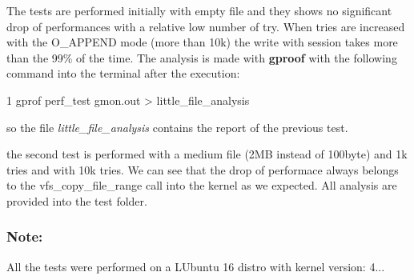 The tests are performed initially with empty file and they shows no significant drop of performances with a relative low number of try. When tries are increased with the O\+\_\+\+A\+P\+P\+E\+ND mode (more than 10k) the write with session takes more than the 99\% of the time. The analysis is made with {\bfseries gproof} with the following command into the terminal after the execution\+: 
\begin{DoxyCode}
1 gprof perf\_test gmon.out > little\_file\_analysis
\end{DoxyCode}
 so the file {\itshape little\+\_\+file\+\_\+analysis} contains the report of the previous test.

the second test is performed with a medium file (2\+MB instead of 100byte) and 1k tries and with 10k tries. We can see that the drop of performace always belongs to the vfs\+\_\+copy\+\_\+file\+\_\+range call into the kernel as we expected. All analysis are provided into the test folder.

\subsubsection*{Note\+:}

All the tests were performed on a L\+Ubuntu 16 distro with kernel version\+: 4... 
